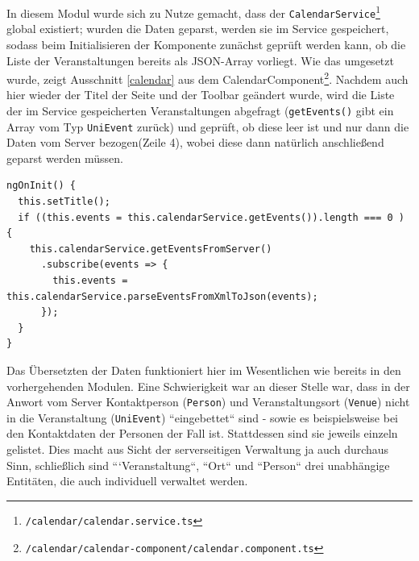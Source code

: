 In diesem Modul wurde sich zu Nutze gemacht, dass der \texttt{CalendarService}\footnote{\texttt{/calendar/calendar.service.ts}} global existiert; wurden die Daten geparst, werden sie im Service gespeichert, sodass beim Initialisieren der Komponente zunächst geprüft werden kann, ob die Liste der Veranstaltungen bereits als \acs{JSON}-Array vorliegt. Wie das umgesetzt wurde, zeigt Ausschnitt \ref{calendar} aus dem CalendarComponent\footnote{\texttt{/calendar/calendar-component/calendar.component.ts}}. Nachdem auch hier wieder der Titel der Seite und der Toolbar geändert wurde, wird die Liste der im Service gespeicherten Veranstaltungen abgefragt (\texttt{getEvents()} gibt ein Array vom Typ \texttt{UniEvent} zurück) und geprüft, ob diese leer ist und nur dann die Daten vom Server bezogen(Zeile 4), wobei diese dann natürlich anschließend geparst werden müssen.

\begin{lstlisting}[float, floatplacement=h, style=htmlcssjs, caption={Initialiserung des \texttt{CalendarComponent}}, label={calendar}]
ngOnInit() {
  this.setTitle();
  if ((this.events = this.calendarService.getEvents()).length === 0 ) {
    this.calendarService.getEventsFromServer()
      .subscribe(events => {
        this.events = this.calendarService.parseEventsFromXmlToJson(events);
      });
  }
}
\end{lstlisting}
Das Übersetzten der Daten funktioniert hier im Wesentlichen wie bereits in den vorhergehenden Modulen. Eine Schwierigkeit war an dieser Stelle war, dass in der Anwort vom Server Kontaktperson (\texttt{Person}) und Veranstaltungsort (\texttt{Venue}) nicht in die Veranstaltung (\texttt{UniEvent}) ``eingebettet`` sind - sowie es beispielsweise bei den Kontaktdaten der Personen der Fall ist. Stattdessen sind sie jeweils einzeln gelistet. Dies macht aus Sicht der serverseitigen Verwaltung ja auch durchaus Sinn, schließlich sind ```Veranstaltung``, ``Ort`` und ``Person`` drei unabhängige Entitäten, die auch individuell verwaltet werden.

